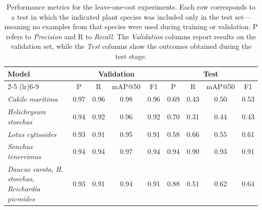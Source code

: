 \documentclass[]{article}
\renewcommand{\(}{\left(}
\renewcommand{\)}{\right)}
\renewcommand{\[}{\left[}
\renewcommand{\]}{\right]}
\begin{document}
\begin{table}[ht]
\centering
\caption{Performance metrics for the leave-one-out experiments. Each row corresponds to a test in which the indicated plant species was included only in the test set—meaning no examples from that species were used during training or validation. P refers to \textit{Precision} and R to \textit{Recall}. The \textit{Validation} columns report results on the validation set, while the \textit{Test} columns show the outcomes obtained during the test stage.}
\begin{tabular}{lcccccccc}
\hline
\textbf{Model} & \multicolumn{4}{c}{\textbf{Validation}} & \multicolumn{4}{c}{\textbf{Test}} \\
\cmidrule(lr){2-5} \cmidrule(lr){6-9}
 & P & R & mAP@50 & F1 & P & R & mAP@50 & F1 \\
\hline
\textit{Cakile maritima} & 0.97 & 0.96 & 0.98 & 0.96 & 0.69 & 0.43 & 0.50 & 0.53 \\
\textit{Helichrysum stoechas} & 0.94 & 0.92 & 0.96 & 0.92 & 0.70 & 0.31 & 0.44 & 0.43 \\
\textit{Lotus cytisoides} & 0.93 & 0.91 & 0.95 & 0.91 & 0.58 & 0.66 & 0.55 & 0.61 \\
\textit{Sonchus tenerrimus} & 0.94 & 0.94 & 0.97 & 0.94 & 0.94 & 0.90 & 0.93 & 0.91 \\
\textit{Daucus carota}, \textit{H. stoechas}, \textit{Reichardia picroides} & 0.93 & 0.91 & 0.94 & 0.91 & 0.88 & 0.51 & 0.62 & 0.64 \\
\hline
\end{tabular}
\label{tab:leave_one_out}
\end{table}
\end{document}
